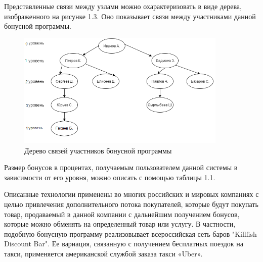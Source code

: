 \documentclass[a4paper,14pt]{extreport}
\theoremstyle{definition}
\begin{document}
Представленные связи между узлами можно охарактеризовать в виде дерева, изображенного на рисунке 1.3. Оно показывает связи между участниками данной бонусной программы.
\begin{figure}[h!]
\begin{center}
\includegraphics[width=10cm]{40.png}
\caption{Дерево связей участников бонусной программы}
\label{fig:3}
\end{center}
\end{figure}

Размер бонусов в процентах, получаемым пользователем данной системы в зависимости от его уровня, можно описать с помощью таблицы 1.1.

\begin{table}[h!]


\end{table}

Описанные технологии применены во многих российских и мировых компаниях с целью привлечения дополнительного потока покупателей, которые будут покупать товар, продаваемый в данной компании с дальнейшим получением бонусов, которые можно обменять на определенный товар или услугу. В частности, подобную бонусную программу реализовывает всероссийская сеть баров "Killfish Discount Bar". Ее вариация, связанную с получением бесплатных поездок на такси, применяется американской службой заказа такси «Uber».
\end{document}
